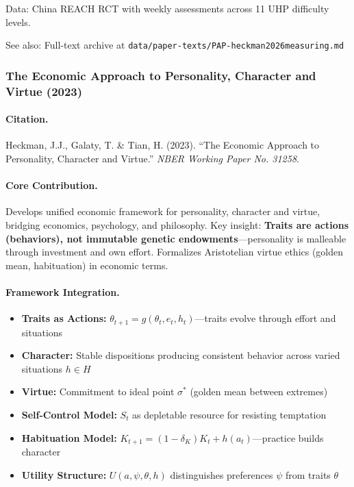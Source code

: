 Data: China REACH RCT with weekly assessments across 11 UHP difficulty levels.

See also: Full-text archive at \texttt{data/paper-texts/PAP-heckman2026measuring.md}

\subsubsection{The Economic Approach to Personality, Character and Virtue (2023)}

\paragraph{Citation.}
Heckman, J.J., Galaty, T. \& Tian, H. (2023). ``The Economic Approach to Personality,
Character and Virtue.'' \emph{NBER Working Paper No. 31258}.
\citep{PAP-heckman2023virtue}

\paragraph{Core Contribution.}
Develops unified economic framework for personality, character and virtue, bridging
economics, psychology, and philosophy. Key insight: \textbf{Traits are actions (behaviors),
not immutable genetic endowments}---personality is malleable through investment and own
effort. Formalizes Aristotelian virtue ethics (golden mean, habituation) in economic terms.

\paragraph{Framework Integration.}
\begin{itemize}
  \item \textbf{Traits as Actions:} $\theta_{t+1} = g(\theta_t, e_t, h_t)$---traits evolve
        through effort and situations
  \item \textbf{Character:} Stable dispositions producing consistent behavior across
        varied situations $h \in H$
  \item \textbf{Virtue:} Commitment to ideal point $\sigma^*$ (golden mean between extremes)
  \item \textbf{Self-Control Model:} $S_t$ as depletable resource for resisting temptation
  \item \textbf{Habituation Model:} $K_{t+1} = (1-\delta_K)K_t + h(a_t)$---practice builds
        character
  \item \textbf{Utility Structure:} $U(a, \psi, \theta, h)$ distinguishes preferences
        $\psi$ from traits $\theta$
\end{itemize}

